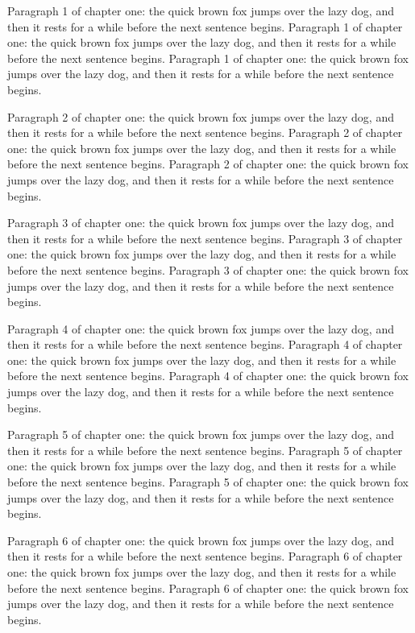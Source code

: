 Paragraph 1 of chapter one: the quick brown fox jumps over the lazy dog, and then it rests for a while before the next sentence begins. Paragraph 1 of chapter one: the quick brown fox jumps over the lazy dog, and then it rests for a while before the next sentence begins. Paragraph 1 of chapter one: the quick brown fox jumps over the lazy dog, and then it rests for a while before the next sentence begins. 

Paragraph 2 of chapter one: the quick brown fox jumps over the lazy dog, and then it rests for a while before the next sentence begins. Paragraph 2 of chapter one: the quick brown fox jumps over the lazy dog, and then it rests for a while before the next sentence begins. Paragraph 2 of chapter one: the quick brown fox jumps over the lazy dog, and then it rests for a while before the next sentence begins. 

Paragraph 3 of chapter one: the quick brown fox jumps over the lazy dog, and then it rests for a while before the next sentence begins. Paragraph 3 of chapter one: the quick brown fox jumps over the lazy dog, and then it rests for a while before the next sentence begins. Paragraph 3 of chapter one: the quick brown fox jumps over the lazy dog, and then it rests for a while before the next sentence begins. 

Paragraph 4 of chapter one: the quick brown fox jumps over the lazy dog, and then it rests for a while before the next sentence begins. Paragraph 4 of chapter one: the quick brown fox jumps over the lazy dog, and then it rests for a while before the next sentence begins. Paragraph 4 of chapter one: the quick brown fox jumps over the lazy dog, and then it rests for a while before the next sentence begins. 

Paragraph 5 of chapter one: the quick brown fox jumps over the lazy dog, and then it rests for a while before the next sentence begins. Paragraph 5 of chapter one: the quick brown fox jumps over the lazy dog, and then it rests for a while before the next sentence begins. Paragraph 5 of chapter one: the quick brown fox jumps over the lazy dog, and then it rests for a while before the next sentence begins. 

Paragraph 6 of chapter one: the quick brown fox jumps over the lazy dog, and then it rests for a while before the next sentence begins. Paragraph 6 of chapter one: the quick brown fox jumps over the lazy dog, and then it rests for a while before the next sentence begins. Paragraph 6 of chapter one: the quick brown fox jumps over the lazy dog, and then it rests for a while before the next sentence begins. 

